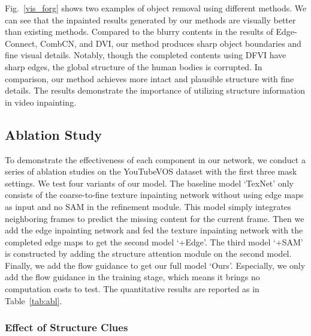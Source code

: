 Fig.~\ref{vis_forg} shows two examples of object removal using different methods. 
We can see that the inpainted results generated by our methods are visually better than existing methods.
Compared to the blurry contents in the results of Edge-Connect, CombCN, and DVI, our method produces sharp object boundaries and fine visual details. Notably, though the completed contents using DFVI have sharp edges, the global structure of the human bodies is corrupted. In comparison, our method achieves more intact and plausible structure with fine details.
The results demonstrate the importance of utilizing structure information in video inpainting. 




\subsection{Ablation Study}
To demonstrate the effectiveness of each component in our network, we conduct a series of ablation studies on the YouTubeVOS dataset with the first three mask settings. 
%
We test four variants of our model. 
The baseline model `TexNet' only consists of the coarse-to-fine texture inpainting network without using edge maps as input and no SAM in the refinement module.
This model simply integrates neighboring frames to predict the missing content for the current frame.
%
Then we add the edge inpainting network and fed the texture inpainting network with the completed edge maps to get the second model `+Edge'.
The third model `+SAM' is constructed by adding the structure attention module on the second model. 
Finally, we add the flow guidance to get our full model `Ours'. Especially, we only add the flow guidance in the training stage, which means it brings no computation costs to test.
The quantitative results are reported as in Table~\ref{tab:abl}. 


\subsubsection{Effect of Structure Clues}


